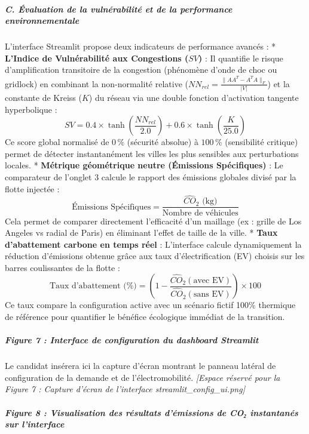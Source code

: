\documentclass[10pt, a4paper]{article}
\begin{document}
\subparagraph{C. Évaluation de la vulnérabilité et de la performance
environnementale}\label{c.-uxe9valuation-de-la-vulnuxe9rabilituxe9-et-de-la-performance-environnementale}

L'interface Streamlit propose deux indicateurs de performance avancés :
* \textbf{L'Indice de Vulnérabilité aux Congestions (\(SV\))} : Il
quantifie le risque d'amplification transitoire de la congestion
(phénomène d'onde de choc ou gridlock) en combinant la non-normalité
relative (\(NN_{rel} = \frac{\|AA^T - A^TA\|_F}{|V|}\)) et la constante
de Kreiss (\(K\)) du réseau via une double fonction d'activation
tangente hyperbolique :
\[SV = 0.4 \times \tanh\left(\frac{NN_{rel}}{2.0}\right) + 0.6 \times \tanh\left(\frac{K}{25.0}\right)\]
Ce score global normalisé de \(0\,\%\) (sécurité absolue) à \(100\,\%\)
(sensibilité critique) permet de détecter instantanément les villes les
plus sensibles aux perturbations locales. * \textbf{Métrique géométrique
neutre (Émissions Spécifiques)} : Le comparateur de l'onglet 3 calcule
le rapport des émissions globales divisé par la flotte injectée :
\[\text{Émissions Spécifiques} = \frac{\widehat{CO}_2 \text{ (kg)}}{\text{Nombre de véhicules}}\]
Cela permet de comparer directement l'efficacité d'un maillage (ex :
grille de Los Angeles vs radial de Paris) en éliminant l'effet de taille
de la ville. * \textbf{Taux d'abattement carbone en temps réel} :
L'interface calcule dynamiquement la réduction d'émissions obtenue grâce
aux taux d'électrification (EV) choisis sur les barres coulissantes de
la flotte :
\[\text{Taux d'abattement (\%)} = \left( 1 - \frac{\widehat{CO}_2(\text{avec EV})}{\widehat{CO}_2(\text{sans EV})} \right) \times 100\]
Ce taux compare la configuration active avec un scénario fictif 100\%
thermique de référence pour quantifier le bénéfice écologique immédiat
de la transition.

\subparagraph{Figure 7 : Interface de configuration du dashboard
Streamlit}\label{figure-7-interface-de-configuration-du-dashboard-streamlit}

Le candidat insérera ici la capture d'écran montrant le panneau latéral
de configuration de la demande et de l'électromobilité. \emph{{[}Espace
réservé pour la Figure 7 : Capture d'écran de l'interface
streamlit\_config\_ui.png{]}}

\subparagraph{Figure 8 : Visualisation des résultats d'émissions de CO₂
instantanés sur
l'interface}\label{figure-8-visualisation-des-ruxe9sultats-duxe9missions-de-coux2082-instantanuxe9s-sur-linterface}
\end{document}
